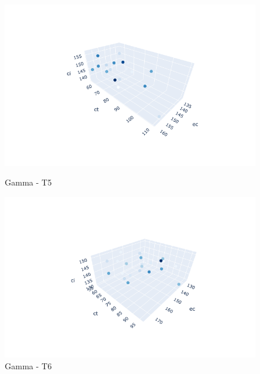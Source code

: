 \documentclass{hust}
\begin{document}
\begin{itemize}
	\begin{figure}[H]
		\begin{minipage}{0.5\textwidth}
			\centering
			\includegraphics[width=1.2\linewidth]{images/ga-dem5.png}
			\caption{Gamma - T5}\label{fig:nsga-ii-ga-dem5}
		\end{minipage}\hfill
		\begin{minipage}{0.5\textwidth}
			\centering
			\includegraphics[width=1.2\linewidth]{images/ga-dem6.png}
			\caption{Gamma - T6}\label{fig:nsga-ii-ga-dem6}
		\end{minipage}
	\end{figure}


\end{itemize}
\end{document}
